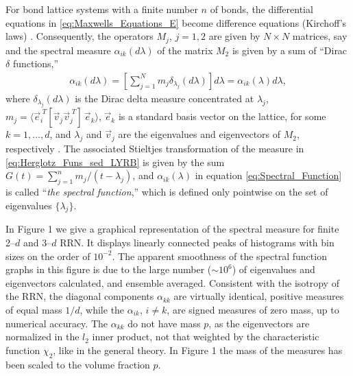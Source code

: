 \documentclass[english,12pt,jmp,graphicx]{revtex4-1}
\begin{document}
For bond lattice systems with a finite number $n$ of 
bonds, the differential equations in \eqref{eq:Maxwells_Equations_E}
become difference equations (Kirchoff's laws)
\cite{Golden:JMP-5627}. Consequently, the operators $M_j$,
$j=1,2$ are given by $N\times N$ matrices, say
\cite{Golden:JoB:337,Golden:JMP-5627} and 
the spectral measure $\alpha_{ik}(d\lambda)$ of the matrix $M_2$ is
given by a sum of ``Dirac $\delta$ functions,''
%
\begin{align}\label{eq:Spectral_Function}
  \alpha_{ik}(d\lambda)=
    \left[\sum_{j=1}^N m_j \delta_{\lambda_j}(d\lambda)\right]d\lambda
      =\alpha_{ik}(\lambda)d\lambda,
\end{align}
%
where $\delta_{\lambda_j}(d\lambda)$ is the Dirac delta measure concentrated at $\lambda_j$,
$m_j=\langle\vec{e}_i^{\;T}[\vec{v}_j\vec{v}_j^{\;T}]\,\vec{e}_k\rangle$, 
$\vec{e}_k$ is a standard basis vector on the lattice, for some
$k=1,\ldots,d$, and $\lambda_j$ and $\vec{v}_j$ are the eigenvalues and
eigenvectors of $M_2$, 
respectively \cite{Golden:JoB:337}. 
The associated Stieltjes transformation of the measure in
\eqref{eq:Herglotz_Funs_sed_LYRB} is  
given by the sum $G(t)=\sum_{j=1}^nm_j/(t-\lambda_j)$, and $\alpha_{ik}(\lambda)$ in equation
\eqref{eq:Spectral_Function} is called ``\emph{the spectral
  function},'' which is defined only pointwise on the set of
eigenvalues $\{\lambda_j\}$.

In Figure 1 we give a graphical
representation of the spectral measure for finite 2--$d$ and 3--$d$
RRN. It displays linearly connected peaks of histograms with bin
sizes on the order of $10^{-2}$. The apparent smoothness of the
spectral function graphs in this figure is due to the large number
($\sim10^6$) of eigenvalues and eigenvectors calculated, and ensemble
averaged. Consistent with the isotropy of the
RRN, the diagonal components $\alpha_{kk}$ are virtually identical,
positive measures of equal mass $1/d$, while the $\alpha_{ik}$, $i\neq k$, are
signed measures of zero mass, up to numerical accuracy. The $\alpha_{kk}$
do not have mass $p$, as the eigenvectors are normalized in the $l_2$
inner product, not that weighted by the characteristic function $\chi_2$,
like in the general theory. In Figure 1 the mass of the measures has
been scaled to the volume fraction $p$.  
\end{document}
